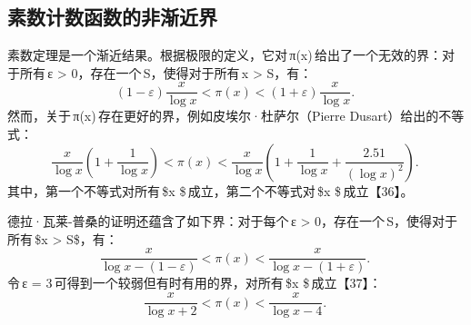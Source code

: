 \subsection{素数计数函数的非渐近界}
素数定理是一个渐近结果。根据极限的定义，它对 π(x) 给出了一个无效的界：对于所有 ε > 0，存在一个 S，使得对于所有 x > S，有：
$$
(1 - \varepsilon)\frac{x}{\log x} < \pi(x) < (1 + \varepsilon)\frac{x}{\log x}.~
$$
然而，关于 π(x) 存在更好的界，例如皮埃尔·杜萨尔（Pierre Dusart）给出的不等式：
$$
\frac{x}{\log x}\left(1 + \frac{1}{\log x}\right) < \pi(x) < \frac{x}{\log x}\left(1 + \frac{1}{\log x} + \frac{2.51}{(\log x)^2}\right).~
$$
其中，第一个不等式对所有 \$x \$ 成立，第二个不等式对 \$x \$ 成立【36】。

德拉·瓦莱-普桑的证明还蕴含了如下界：对于每个 ε > 0，存在一个 S，使得对于所有 \$x > S\$，有：
$$
\frac{x}{\log x - (1 - \varepsilon)} < \pi(x) < \frac{x}{\log x - (1 + \varepsilon)}.~
$$
令 ε = 3 可得到一个较弱但有时有用的界，对所有 \$x \$ 成立【37】：
$$
\frac{x}{\log x + 2} < \pi(x) < \frac{x}{\log x - 4}.~
$$

